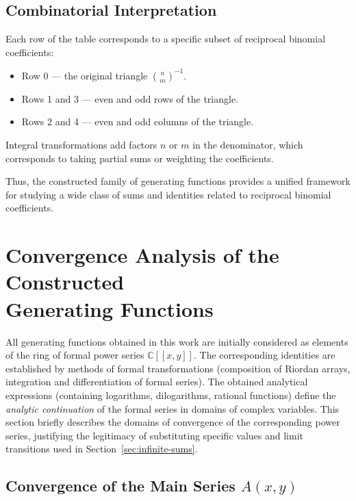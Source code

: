 \documentclass[12pt]{article}
\begin{document}
\subsection{Combinatorial Interpretation}

Each row of the table corresponds to a specific subset of reciprocal binomial coefficients:
\begin{itemize}
\item Row 0 — the original triangle \(\binom{n}{m}^{-1}\).
\item Rows 1 and 3 — even and odd rows of the triangle.
\item Rows 2 and 4 — even and odd columns of the triangle.
\end{itemize}
Integral transformations add factors \(n\) or \(m\) in the denominator, which corresponds to taking partial sums or weighting the coefficients.

Thus, the constructed family of generating functions provides a unified framework for studying a wide class of sums and identities related to reciprocal binomial coefficients.

\section{Convergence Analysis of the Constructed\\ Generating Functions}\label{sec:convergence}

All generating functions obtained in this work are initially considered as elements of the ring of formal power series $\mathbb{C}[[x,y]]$.
The corresponding identities are established by methods of formal transformations
(composition of Riordan arrays, integration and differentiation of formal series).
The obtained analytical expressions (containing logarithms, dilogarithms,
rational functions) define the \emph{analytic continuation} of the formal
series in domains of complex variables. This section briefly describes the domains
of convergence of the corresponding power series, justifying the legitimacy
of substituting specific values and limit transitions used in Section~\ref{sec:infinite-sums}.

\subsection{Convergence of the Main Series $A(x,y)$}
\end{document}
